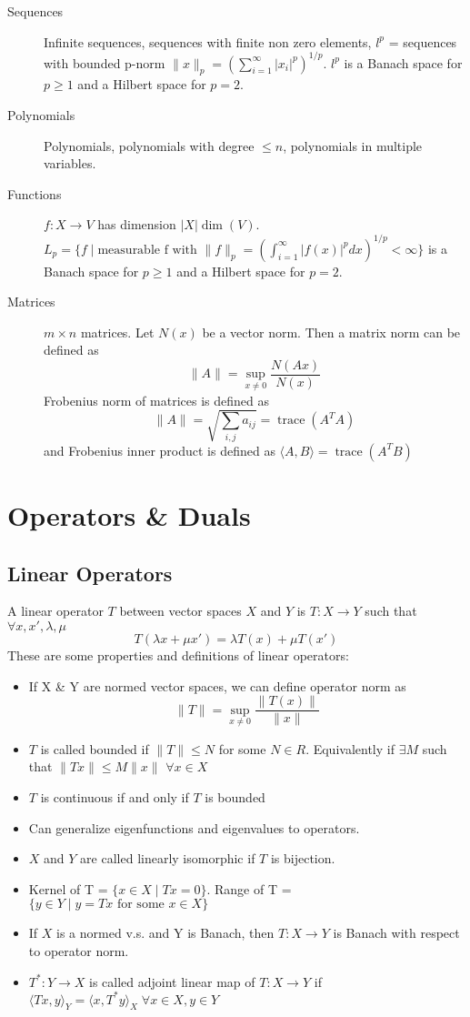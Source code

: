 \documentclass[a4paper,11pt]{article}
\newcommand{\norm}[1]{\|#1\|}
\newcommand\inrpd[2]{\langle #1, #2 \rangle}
\begin{document}
\begin{description}
\item[Sequences] Infinite sequences, sequences with finite non zero elements, $l^p$ = sequences with bounded p-norm $\|x\|_p = \left(\sum_{i = 1}^\infty |x_i|^p \right)^{1/p}$. $l^p$ is a Banach space for $p \geq 1$ and a Hilbert space for $p = 2$.

\item[Polynomials] Polynomials, polynomials with degree $\leq n$, polynomials in multiple variables. 

\item[Functions] $f: X \rightarrow V$ has dimension $|X|\operatorname{dim}(V)$.
$L_p = \{ f \mid \text{measurable f with }  \|f\|_p = \left(\int_{i = 1}^\infty |f(x)|^p dx \right)^{1/p} < \infty \}$ is a Banach space for $p \geq 1$ and a Hilbert space for $p = 2$.

\item[Matrices] $m \times n$ matrices. Let $N(x)$ be a vector norm. Then a matrix norm can be defined as 
\[
\|A\| = \sup_{x \neq 0} \frac{N(Ax)}{N(x)}
\]
Frobenius norm of matrices is defined as
\[
\|A\| = \sqrt{\sum_{i,j} a_{ij}} = \operatorname{trace}(A^TA)
\]
and Frobenius inner product is defined as $\inrpd{A}{B} = \operatorname{trace}(A^T B)$
\end{description}

\section{Operators \& Duals}
\subsection{Linear Operators}
A linear operator $T$ between vector spaces $X$ and $Y$ is $T: X\rightarrow Y$ such that $\forall x,x', \lambda, \mu$ 
\[
T(\lambda x + \mu x') =\lambda  T(x )+ \mu T(x') 
\] 
These are some properties and definitions of linear operators:
\begin{itemize}
\item If X \& Y are normed vector spaces, we can define operator norm as
\[
\|T\| = \sup_{x \neq 0} \frac{\norm{T(x)}}{\norm{x}}
\]
\item $T$ is called bounded if $\norm{T} \leq N$ for some $N \in R$. Equivalently if $\exists M$ such that $\norm{Tx} \leq M \norm{x}$  $\forall x \in X$
\item $T$ is continuous if and only if $T$ is bounded
\item Can generalize eigenfunctions and eigenvalues to operators.
\item $X$ and $Y$ are called linearly isomorphic if $T$ is bijection.
\item Kernel of T = $\{x \in X \mid Tx = 0 \}$. Range of T = $\{y \in Y \mid y = Tx \text{ for some } x \in X \}$
\item If $X$ is a normed v.s. and Y is Banach, then $T: X \rightarrow Y$ is Banach with respect to operator norm.
\item $T^*: Y \rightarrow X$ is called adjoint linear map of $T: X \rightarrow Y$ if $\inrpd{Tx}{y}_Y = \inrpd{x}{T^*y}_X \; \forall x \in X, y \in Y$
\end{itemize}
\end{document}
